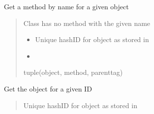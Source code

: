 \documentclass[letterpaper,10pt,english]{sphinxmanual}
\begin{document}
\begin{savenotes}
\begin{fulllineitems}
\begin{savenotes}\begin{fulllineitems}
\label{\detokenize{eezz:eezz.service.TService.get_method}}
\pysigstartsignatures
{}
\pysigstopsignatures
\sphinxAtStartPar
Get a method by name for a given object
\begin{quote}\begin{description}
\sphinxAtStartPar
{} \textendash{} Class has no method with the given name

\begin{itemize}
\item {} 
\sphinxAtStartPar
{} \textendash{} Unique hash\sphinxhyphen{}ID for object as stored in {\hyperref[\detokenize{eezz:eezz.service.TService.assign_object}]{}}

\item {} 
\sphinxAtStartPar
{} \textendash{} 

\end{itemize}

\sphinxAtStartPar
tuple(object, method, parent\sphinxhyphen{}tag)

\end{description}\end{quote}

\end{fulllineitems}\end{savenotes}


\begin{savenotes}\begin{fulllineitems}
\label{\detokenize{eezz:eezz.service.TService.get_object}}
\pysigstartsignatures
{}
\pysigstopsignatures
\sphinxAtStartPar
Get the object for a given ID
\begin{quote}\begin{description}
\sphinxAtStartPar
{} \textendash{} Unique hash\sphinxhyphen{}ID for object as stored in 


\end{description}
\end{quote}
\end{fulllineitems}
\end{savenotes}
\end{fulllineitems}
\end{savenotes}
\end{document}
